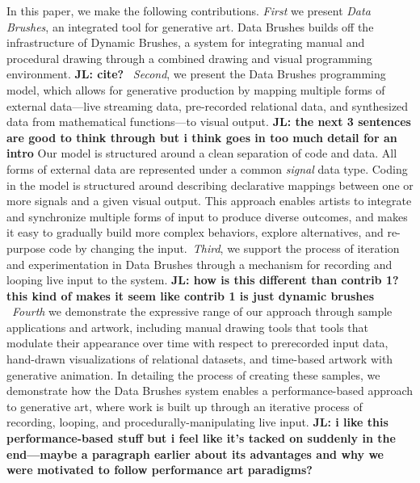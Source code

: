 \documentclass{sigchi}
\newcommand {\jingyi}[1]{{\color{purple}\bf{JL: #1}\normalfont}}
\begin{document}
In this paper, we make the following contributions. \textit{First} we present \textit{Data Brushes}, an integrated  tool for generative art. Data Brushes builds off the infrastructure of Dynamic Brushes, a system for integrating manual and procedural drawing through a combined drawing and visual programming environment. \jingyi{cite?} ~\textit{Second}, we present the Data Brushes programming model, which allows for generative production by mapping multiple forms of external data---live streaming data, pre-recorded relational data, and synthesized data from mathematical functions---to visual output. \jingyi{the next 3 sentences are good to think through but i think goes in too much detail for an intro} Our model is structured around a clean separation of code and data. All forms of external data are represented under a common \textit{signal} data type. Coding in the model is structured around describing declarative mappings between one or more signals and a given visual output. This approach enables artists to integrate and synchronize multiple forms of input to produce diverse outcomes, and makes it easy to gradually build more complex behaviors, explore alternatives, and re-purpose code by changing the input.~\textit{Third}, we support the process of iteration and experimentation in Data Brushes through a mechanism for recording and looping live input to the system. \jingyi{how is this different than contrib 1? this kind of makes it seem like contrib 1 is just dynamic brushes} ~\textit{Fourth} we demonstrate the expressive range of our approach through sample applications and artwork, including manual drawing tools that tools that modulate their appearance over time with respect to prerecorded input data, hand-drawn visualizations of relational datasets, and time-based artwork with generative animation. In detailing the process of creating these samples, we demonstrate how the Data Brushes system enables a performance-based approach to generative art, where work is built up through an iterative process of recording, looping, and procedurally-manipulating live input. \jingyi{i like this performance-based stuff but i feel like it's tacked on suddenly in the end---maybe a paragraph earlier about its advantages and why we were motivated to follow performance art paradigms?}



\end{document}
